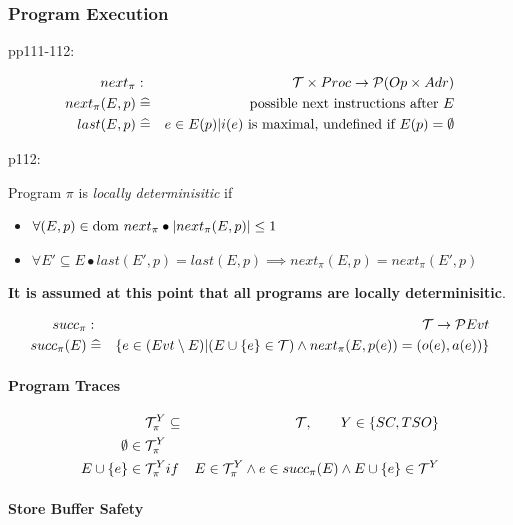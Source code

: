 \subsubsection{Program Execution}

pp111-112:

\begin{eqnarray*}
   next_\pi &:& \mathcal{T} \times Proc \mathrel{\rightarrow} \mathcal{P}(Op \times Adr)
\\ next_\pi(E,p) &\mathrel{\widehat=}& \mbox{possible next instructions after } E
\\ last(E,p) &\mathrel{\widehat=}& e \in E(p) |
                     i(e) \mbox{ is maximal, undefined if } E(p)=\emptyset
\end{eqnarray*}

p112:

Program $\pi$ is \emph{locally determinisitic} if
\begin{itemize}
  \item $\forall (E,p) \in \mathrm{dom}~ next_\pi \bullet |next_\pi(E,p)| \leq 1$
  \item $\forall E' \subseteq E
         \bullet
         last(E',p)=last(E,p)
         \implies
         next_\pi(E,p)=next_\pi(E',p)$
\end{itemize}
\textbf{It is assumed at this point that all programs are locally determinisitic}.

\begin{eqnarray*}
   succ_\pi &:& \mathcal{T} \mathrel{\rightarrow} \mathcal{P} Evt
\\ succ_\pi(E)
   &\mathrel{\widehat=}&
   \{ e \in (Evt\setminus E)
      |
      (E \cup \{{e}\} \in \mathcal{T})
      \land
      next_\pi(E,p(e))=(o(e),a(e))
   \}
\end{eqnarray*}

\paragraph{Program Traces}

\begin{eqnarray*}
   \mathcal{T}_\pi^Y &\subseteq& \mathcal{T}, \qquad Y \in \{{SC,TSO}\}
\\ \emptyset \in \mathcal{T}_\pi^Y
\\ E \cup \{{e}\} \in \mathcal{T}_\pi^Y
   &if& E \in \mathcal{T}_\pi^Y
        \land e \in succ_\pi(E)
        \land E \cup \{{e}\} \in \mathcal{T}^Y
\end{eqnarray*}

\paragraph{Store Buffer Safety}

